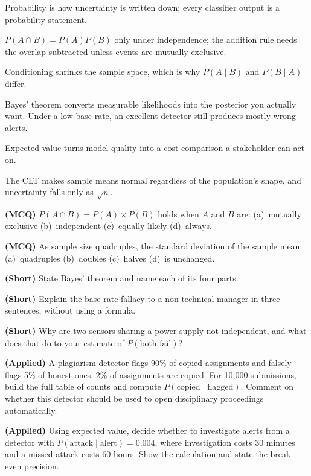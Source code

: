 \begin{chaptersummary}
\begin{tight}
  \item Probability is how uncertainty is written down; every classifier output is
        a probability statement.
  \item $P(A \cap B) = P(A)P(B)$ only under independence; the addition rule needs
        the overlap subtracted unless events are mutually exclusive.
  \item Conditioning shrinks the sample space, which is why $P(A\mid B)$ and
        $P(B\mid A)$ differ.
  \item Bayes' theorem converts measurable likelihoods into the posterior you
        actually want. Under a low base rate, an excellent detector still produces
        mostly-wrong alerts.
  \item Expected value turns model quality into a cost comparison a stakeholder can
        act on.
  \item The CLT makes sample means normal regardless of the population's shape, and
        uncertainty falls only as $\sqrt{n}$.
\end{tight}
\end{chaptersummary}

\begin{reviewq}
  \item \textbf{(MCQ)} $P(A \cap B) = P(A) \times P(B)$ holds when $A$ and $B$ are:
        (a)~mutually exclusive (b)~independent (c)~equally likely (d)~always.
  \item \textbf{(MCQ)} As sample size quadruples, the standard deviation of the
        sample mean: (a)~quadruples (b)~doubles (c)~halves (d)~is unchanged.
  \item \textbf{(Short)} State Bayes' theorem and name each of its four parts.
  \item \textbf{(Short)} Explain the base-rate fallacy to a non-technical manager
        in three sentences, without using a formula.
  \item \textbf{(Short)} Why are two sensors sharing a power supply not independent,
        and what does that do to your estimate of $P(\text{both fail})$?
  \item \textbf{(Applied)} A plagiarism detector flags 90\% of copied assignments
        and falsely flags 5\% of honest ones. 2\% of assignments are copied. For
        10{,}000 submissions, build the full table of counts and compute
        $P(\text{copied} \mid \text{flagged})$. Comment on whether this detector
        should be used to open disciplinary proceedings automatically.
  \item \textbf{(Applied)} Using expected value, decide whether to investigate
        alerts from a detector with $P(\text{attack}\mid\text{alert}) = 0.004$,
        where investigation costs 30 minutes and a missed attack costs 60 hours.
        Show the calculation and state the break-even precision.
\end{reviewq}
